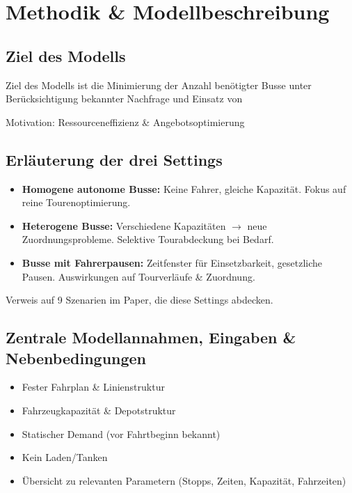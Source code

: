 \chapter{Methodik \& Modellbeschreibung}
\section{Ziel des Modells}
Ziel des Modells ist die Minimierung der Anzahl benötigter Busse unter Berücksichtigung bekannter Nachfrage und Einsatz von 


Motivation: Ressourceneffizienz \& Angebotsoptimierung
\section{Erläuterung der drei Settings}
\begin{itemize}
    \item \textbf{Homogene autonome Busse:} Keine Fahrer, gleiche Kapazität. Fokus auf reine Tourenoptimierung.
    \item \textbf{Heterogene Busse:} Verschiedene Kapazitäten \(\rightarrow\) neue Zuordnungsprobleme. Selektive Tourabdeckung bei Bedarf.
    \item \textbf{Busse mit Fahrerpausen:} Zeitfenster für Einsetzbarkeit, gesetzliche Pausen. Auswirkungen auf Tourverläufe \& Zuordnung.
\end{itemize}

Verweis auf  9 Szenarien im Paper, die diese Settings abdecken.
\section{Zentrale Modellannahmen, Eingaben \& Nebenbedingungen}
\begin{itemize}
    \item Fester Fahrplan \& Linienstruktur
    \item Fahrzeugkapazität \& Depotstruktur
    \item Statischer Demand (vor Fahrtbeginn bekannt)
    \item Kein Laden/Tanken
    \item Übersicht zu relevanten Parametern (Stopps, Zeiten, Kapazität, Fahrzeiten)
\end{itemize}
